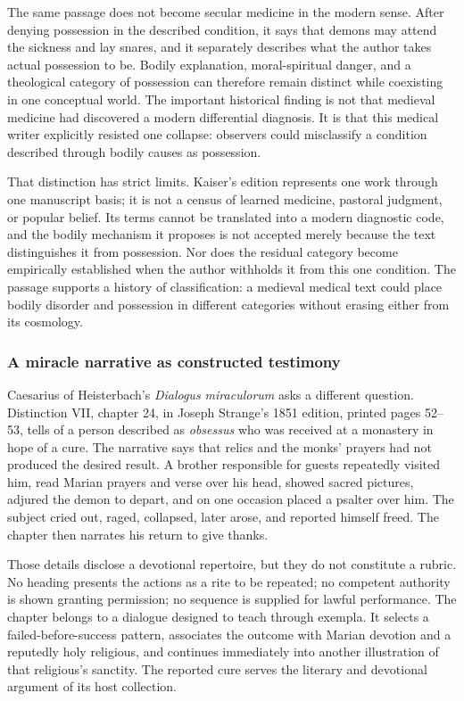 The same passage does not become secular medicine in the modern sense. After
denying possession in the described condition, it says that demons may attend
the sickness and lay snares, and it separately describes what the author takes
actual possession to be. Bodily explanation, moral-spiritual danger, and a
theological category of possession can therefore remain distinct while
coexisting in one conceptual world. The important historical finding is not
that medieval medicine had discovered a modern differential diagnosis. It is
that this medical writer explicitly resisted one collapse: observers could
misclassify a condition described through bodily causes as possession.

That distinction has strict limits. Kaiser's edition represents one work
through one manuscript basis; it is not a census of learned medicine, pastoral
judgment, or popular belief. Its terms cannot be translated into a modern
diagnostic code, and the bodily mechanism it proposes is not accepted merely
because the text distinguishes it from possession. Nor does the residual
category become empirically established when the author withholds it from this
one condition. The passage supports a history of classification: a medieval
medical text could place bodily disorder and possession in different categories
without erasing either from its cosmology.

\subsubsection{A miracle narrative as constructed testimony}

Caesarius of Heisterbach's \emph{Dialogus miraculorum} asks a different
question. Distinction VII, chapter 24, in Joseph Strange's 1851 edition,
printed pages 52--53, tells of a person described as \emph{obsessus} who was
received at a monastery in hope of a cure. The narrative says that relics and
the monks' prayers had not produced the desired result. A brother responsible
for guests repeatedly visited him, read Marian prayers and verse over his head,
showed sacred pictures, adjured the demon to depart, and on one occasion placed
a psalter over him. The subject cried out, raged, collapsed, later arose, and
reported himself freed. The chapter then narrates his return to give thanks.

Those details disclose a devotional repertoire, but they do not constitute a
rubric. No heading presents the actions as a rite to be repeated; no competent
authority is shown granting permission; no sequence is supplied for lawful
performance. The chapter belongs to a dialogue designed to teach through
exempla. It selects a failed-before-success pattern, associates the outcome
with Marian devotion and a reputedly holy religious, and continues immediately
into another illustration of that religious's sanctity. The reported cure
serves the literary and devotional argument of its host collection.

